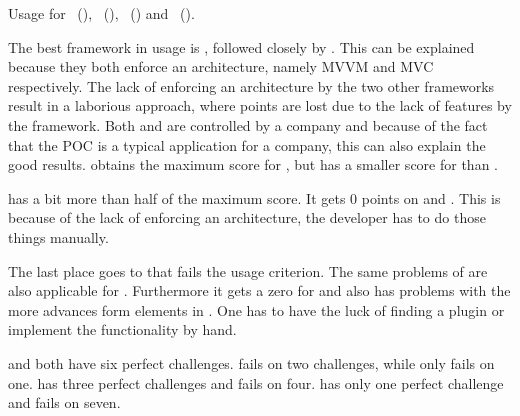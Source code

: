 \documentclass[a4paper]{artikel3}
\begin{document}
\begin{table}
\centering
\resizebox{\columnwidth}{!} {
}
\caption{Usage for \st{}~(\sta), \kendo{}~(\kendoa), \jqm{}~(\jqma) and \lungo{}~(\lungoa).}
\label{tabel:evaluatie-usage}
\end{table}

The best framework in usage is \kendob{}, followed closely by \sta{}.
This can be explained because they both enforce an architecture, namely MVVM and MVC respectively.
The lack of enforcing an architecture by the two other frameworks result in a laborious approach, where points are lost due to the lack of features by the framework.
Both \kendob{} and \sta{} are controlled by a company and because of the fact that the POC is a typical application for a company, this can also explain the good results.
\kendob{} obtains the maximum score for , but has a smaller score for  than \sta.

\jqma{} has a bit more than half of the maximum score.
It gets 0 points on  and .
This is because of the lack of enforcing an architecture, the developer has to do those things manually. 

The last place goes to \lungo{} that fails the usage criterion.
The same problems of \jqma{} are also applicable for \lungo{}.
Furthermore it gets a zero for  and also has problems with the more advances form elements in .
One has to have the luck of finding a plugin or implement the functionality by hand.

\kendob{} and \sta{} both have six perfect challenges.
\kendob{} fails on two challenges, while \sta{} only fails on one.
\jqm{} has three perfect challenges and fails on four.
\lungo{} has only one perfect challenge and fails on seven.
\end{document}
